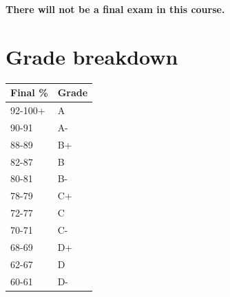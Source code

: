 \documentclass[11pt]{article}
\begin{document}
	\textbf{There will not be a final exam in this course.}

	
\section*{Grade breakdown}

\begin{table}[h!]
\hspace{20pt}
    \begin{tabular}{l|l}
\textbf{Final \%} & \textbf{Grade}\\\hline
92-100+ & A\\
90-91	& A-\\
88-89	& B+\\
82-87	& B\\
80-81	& B-\\
78-79	& C+\\
72-77	& C\\\hline
70-71	& C-\\
68-69	& D+\\
62-67	& D\\
60-61	& D- \\
    \end{tabular}
    \label{tab:my_label}
\end{table}

\end{document}
